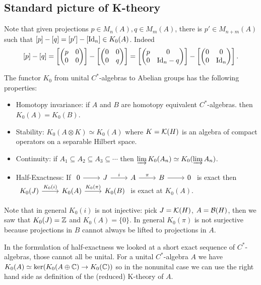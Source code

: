 \subsection{Standard picture of K-theory}
Note that given projections $p\in M_n(A),q\in M_m(A)$, there is $p'\in M_{n+m}(A)$ such that $[p]-[q]=[p']-[\mathrm{Id}_n]\in K_0(A)$. Indeed $$[p]-[q]=\left[\begin{pmatrix} p & 0 \\ 0 & 0\end{pmatrix}\right]-\left[\begin{pmatrix} 0 & 0 \\ 0 & q\end{pmatrix}\right]=\left[\begin{pmatrix}p & 0 \\ 0 & \mathrm{Id}_n-q\end{pmatrix}\right]-\left[\begin{pmatrix} 0 & 0 \\ 0 & \mathrm{Id}_n\end{pmatrix}\right].$$

\begin{theorem}
 The functor $K_0$ from unital $C^\ast$-algebras to Abelian groups has the following properties:
 \begin{itemize}
  \item Homotopy invariance: if $A$ and $B$ are homotopy equivalent $C^\ast$-algebras. then $K_0(A)=K_0(B)$.
  \item Stability: $K_0(A\otimes K)\simeq K_0(A)$ where $K=\mathcal{K}(H)$ is an algebra of compact operators on a separable Hilbert space.
  \item Continuity: if $A_1\subseteq A_2\subseteq A_3\subseteq\cdots$ then $\varinjlim K_0(A_n)\simeq K_0(\varinjlim A_n)$.
  \item Half-Exactness: If $\begin{tikzcd}0\arrow[r]& J\arrow["i",r] & A \arrow["\pi",r] & B\arrow[r] & 0\end{tikzcd}$ is exact then $\begin{tikzcd}K_0(J)\arrow["K_0(i)",r] & K_0(A)\arrow["K_0(\pi)",r] & K_0(B)\end{tikzcd}$ is exact at $K_0(A)$.
 \end{itemize}
\end{theorem}

\noindent Note that in general $K_0(i)$ is not injective: pick $J=\mathcal{K}(H)$, $A=\mathcal{B}(H)$, then we saw that $K_0(J)=\mathbb{Z}$ and $K_0(A)=\{0\}$. In general $K_0(\pi)$ is not surjective because projections in $B$ cannot always be lifted to projections in $A$.

\begin{remark}
 In the formulation of half-exactness we looked at a short exact sequence of $C^\ast$-algebras, those cannot all be unital. For a unital $C^\ast$-algebra $A$ we have $K_0(A)\simeq\ker(K_0(A\oplus\mathbb{C})\to K_0(\mathbb{C}))$ so in the nonunital case we can use the right hand side as definition of the (reduced) K-theory of $A$.
\end{remark}
